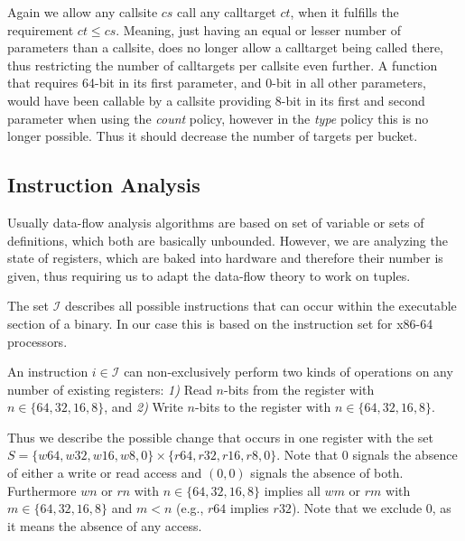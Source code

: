 Again we allow any callsite $cs$ call any calltarget $ct$, when it fulfills the requirement $ct \leq cs$. 
Meaning, just having an equal or lesser number of parameters than a callsite, does no longer allow a calltarget being called there, thus restricting the number of calltargets per 
callsite even further. A function that requires 64-bit in its first parameter, and 0-bit in all other parameters, would have been callable by a callsite providing 8-bit 
in its first and second parameter when using the \emph{count} policy, however in the \emph{type} policy this is no longer possible. Thus it should decrease the number of targets per bucket.


\subsection{Instruction Analysis}
\label{section:instructionanalysis}
Usually data-flow analysis algorithms are based on set of variable or sets of definitions, which both are basically unbounded. However, we are analyzing the state of registers, which are baked into hardware and therefore their number is given, thus requiring us to adapt the data-flow theory to work on tuples.

The set $\mathcal{I}$ describes all possible instructions that can occur within the executable section of a binary. In our case this is based on the instruction set for x86-64 processors.

An instruction $i \in \mathcal{I}$ can non-exclusively perform two kinds of operations on any number of existing registers:
\textit{1)} Read $n$-bits from the register with $n \in \{ 64, 32, 16, 8 \}$, and
\textit{2)} Write $n$-bits to the register with $n \in \{ 64, 32, 16, 8 \}$.

Thus we describe the possible change that occurs in one register with the set $S = \{ w64, w32, w16, w8, 0 \} \times \{r64, r32, r16, r8, 0 \}$. Note that 0 signals the absence of either a write or read access and $(0, 0)$ signals the absence of both. Furthermore $wn$ or $rn$ with $n \in \{64,32,16,8\}$ implies all $wm$ or $rm$ with $m \in \{64,32,16,8\}$ and $m < n$ (e.g., $r64$ implies $r32$). Note that we exclude 0, as it means the absence of any access.

